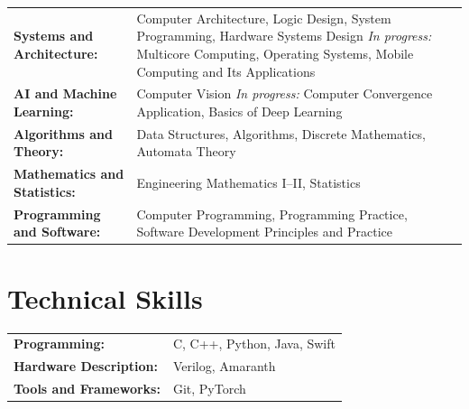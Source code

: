 \documentclass[10pt,a4paper]{article}
\begin{document}
\begin{tabularx}{\textwidth}{@{}l >{\raggedright\arraybackslash}X@{}}
\textbf{Systems and Architecture:} & Computer Architecture, Logic Design, System Programming, Hardware Systems Design \newline \textit{In progress:} Multicore Computing, Operating Systems, Mobile Computing and Its Applications \\
\textbf{AI and Machine Learning:} & Computer Vision \newline \textit{In progress:} Computer Convergence Application, Basics of Deep Learning \\
\textbf{Algorithms and Theory:} & Data Structures, Algorithms, Discrete Mathematics, Automata Theory \\
\textbf{Mathematics and Statistics:} & Engineering Mathematics I--II, Statistics \\
\textbf{Programming and Software:} & Computer Programming, Programming Practice, Software Development Principles and Practice \\
\end{tabularx}

\section*{Technical Skills}

\begin{tabularx}{\textwidth}{@{}l >{\raggedright\arraybackslash}X@{}}
\textbf{Programming:} & C, C++, Python, Java, Swift \\
\textbf{Hardware Description:} & Verilog, Amaranth \\
\textbf{Tools and Frameworks:} & Git, PyTorch \\
\end{tabularx}
\end{document}
